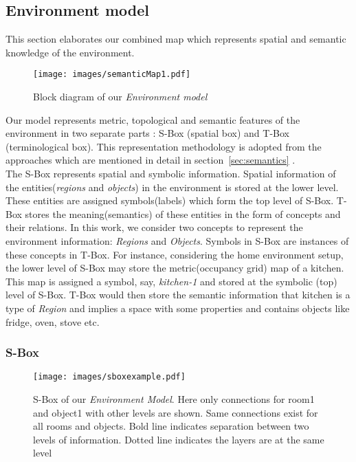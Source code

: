\subsection{Environment model}

This section elaborates our combined map which represents spatial and semantic knowledge of the environment.

\begin{figure}[htbp] %
   \centering
   \texttt{[image: images/semanticMap1.pdf]} 
   \caption{Block diagram of our \textit{Environment model}}
   \label{Figure: Block diagram of our Environment model}
\end{figure}

Our model represents metric, topological and semantic features of the environment in two separate parts \cite{2}:  S-Box (spatial box) and T-Box (terminological box).
This representation methodology is adopted from the approaches \cite{2, 3, 4, 5, 6} which are mentioned in detail in section~\ref{sec:semantics} .\\

The S-Box represents spatial and symbolic information. 
Spatial information of the entities(\textit{regions} and \textit{objects}) in the environment is stored at the lower level. 
These entities are assigned symbols(labels) which form the top level of S-Box. 
T-Box stores the meaning(semantics) of these entities in the form of concepts and their relations.
In this work, we consider two concepts to represent the environment information: \textit{Regions} and \textit{Objects}.
Symbols in S-Box are instances of these concepts in T-Box.
For instance, considering the home environment setup, the lower level of S-Box may store the metric(occupancy grid) map of a kitchen. This map is assigned a symbol, say, \textit{kitchen-1} and stored at the symbolic (top) level of S-Box.
T-Box would then store the semantic information that kitchen is a type of \textit{Region} and implies a space with some properties and contains objects like fridge, oven, stove etc.

\subsubsection{S-Box}
\begin{figure}[htbp] %
   \centering
   \texttt{[image: images/sboxexample.pdf]} 
   \caption[S-Box of our \textit{Environment Model}]
   {S-Box of our \textit{Environment Model}. Here only connections for room1 and object1 with other levels are shown. 
   Same connections exist for all rooms and objects.
   Bold line indicates separation between two levels of information. Dotted line indicates the layers are at the same level}
   \label{fig:Our Semantic map}
\end{figure}

